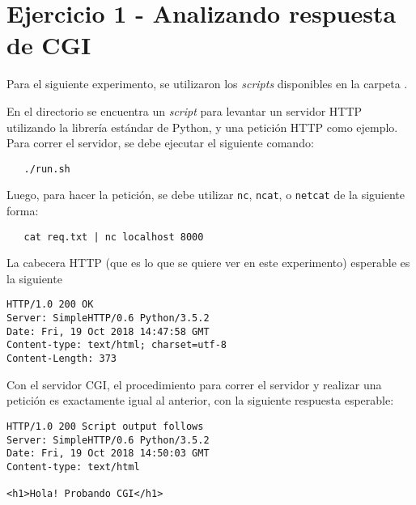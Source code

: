






\clearpage
\tableofcontents
\clearpage 

\lstset{style=MyStyle}

\section{Ejercicio 1 - Analizando respuesta de CGI}

Para el siguiente experimento, se utilizaron los \emph{scripts} disponibles en la carpeta . 

En el directorio  se encuentra un \emph{script} para levantar un servidor HTTP utilizando la librería estándar de Python, y una petición HTTP como ejemplo. Para correr el servidor, se debe ejecutar el siguiente comando:

\begin{lstlisting}
   ./run.sh 
\end{lstlisting}

Luego, para hacer la petición, se debe utilizar \texttt{nc}, \texttt{ncat}, o \texttt{netcat} de la siguiente forma:

\begin{lstlisting}
   cat req.txt | nc localhost 8000 
\end{lstlisting}

La cabecera HTTP (que es lo que se quiere ver en este experimento) esperable es la siguiente

\begin{lstlisting}[title={Cabecera HTTP de la respuesta obtenida del servidor}]
HTTP/1.0 200 OK
Server: SimpleHTTP/0.6 Python/3.5.2
Date: Fri, 19 Oct 2018 14:47:58 GMT
Content-type: text/html; charset=utf-8
Content-Length: 373
\end{lstlisting}

Con el servidor CGI, el procedimiento para correr el servidor y realizar una petición es exactamente igual al anterior, con la siguiente respuesta esperable:

\begin{lstlisting}[title={Respuesta obtenida del servidor CGI}]
HTTP/1.0 200 Script output follows
Server: SimpleHTTP/0.6 Python/3.5.2
Date: Fri, 19 Oct 2018 14:50:03 GMT
Content-type: text/html

<h1>Hola! Probando CGI</h1>
\end{lstlisting}

